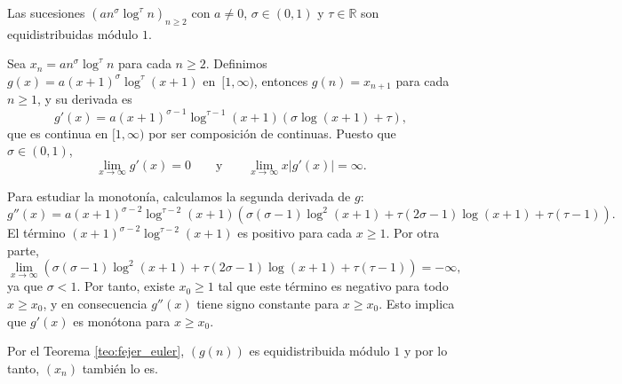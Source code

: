 \begin{example}
    Las sucesiones $(an^\sigma\log^\tau n)_{n\geq2}$ con $a \neq 0$, 
    $\sigma \in (0,1)$ y $\tau \in \mathbb{R}$ son equidistribuidas módulo $1$.
\end{example}

\begin{resolve}
    Sea $x_n = an^\sigma\log^\tau n$ para cada $n \geq 2$. Definimos $g(x) = a(x+1)^\sigma\log^\tau (x+1)$
    en~$[1,\infty)$, entonces $g(n) = x_{n+1}$ para cada $n \geq 1$, y su derivada es 
    \[
        g'(x) = a (x+1)^{\sigma-1} \log^{\tau-1}(x+1) \left(\sigma \log(x+1) + \tau\right),
    \]
    que es continua en $[1,\infty)$ por ser composición de continuas. Puesto que $\sigma \in (0,1)$, 
    \[
        \lim_{x \to \infty} g'(x) = 0
        \qquad \text{y} \qquad
        \lim_{x \to \infty} x |g'(x)| = \infty.
    \]

    Para estudiar la monotonía, calculamos la segunda derivada de $g$:
    \[
        g''(x) = a (x+1)^{\sigma-2} \log^{\tau-2}(x+1) \left( \sigma(\sigma-1)\log^2(x+1) + \tau(2\sigma-1)\log(x+1) + \tau(\tau-1) \right).
    \]
    El término $(x+1)^{\sigma-2} \log^{\tau-2}(x+1)$ es positivo para cada $x \geq 1$.
    Por otra parte,
    \[
        \lim_{x \to \infty} \left( \sigma(\sigma-1)\log^2(x+1) + \tau(2\sigma-1)\log(x+1) + \tau(\tau-1) \right) = -\infty,
    \]
    ya que $\sigma<1$. Por tanto, existe $x_0 \geq 1$ tal que este término es negativo
    para todo $x \geq x_0$, y en consecuencia $g''(x)$ tiene signo constante para $x \geq x_0$.
    Esto implica que $g'(x)$ es monótona para $x \geq x_0$.

    Por el Teorema \ref{teo:fejer_euler}, $(g(n))$ es equidistribuida módulo $1$ y 
    por lo tanto, $(x_n)$ también lo es.
\end{resolve}